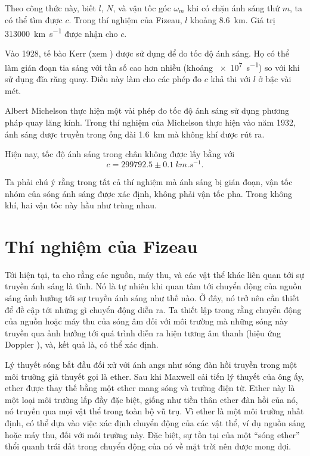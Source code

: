 \noindent
Theo công thức này, biết $l$, $N$, và vận tốc góc $\omega_m$ khi có chặn ánh sáng thứ $m$, ta có thể tìm được $c$.
Trong thí nghiệm của Fizeau, $l$ khoảng \SI{8.6}{km}.
Giá trị \SI{313000}{km.s^{-1}} được nhận cho $c$.

Vào  1928, tế bào Kerr (xem ) được sử dụng để đo tốc độ ánh sáng.
Họ có thể làm gián đoạn tia sáng với tần số cao hơn nhiều (khoảng \SI{e7}{s^{-1}}) so với khi sử dụng đĩa răng quay.
Điều này làm cho các phép đo $c$ khả thi với $l$ ở bậc vài mét.

Albert Michelson thực hiện một vài phép đo tốc độ ánh sáng sử dụng phương pháp quay lăng kính.
Trong thí nghiệm của Michelson thực hiện vào năm 1932, ánh sáng được truyền trong ống dài \SI{1.6}{km} mà không khí được rút ra.

Hiện nay, tốc độ ánh sáng trong chân không được lấy bằng với    
\begin{equation}\label{eq:21_2}
	c = 299792.5 \pm \SI{0.1}{km.s^{-1}}.
\end{equation}

\noindent
Ta phải chú ý rằng trong tất cả thí nghiệm mà ánh sáng bị gián đoạn, vận tốc nhóm của sóng ánh sáng được xác định, không phải vận tốc pha.
Trong không khí, hai vận tốc này hầu như trùng nhau.

\section{Thí nghiệm của Fizeau}\label{sec:21_2}

Tới hiện tại, ta cho rằng các nguồn, máy thu, và các vật thể khác liên quan tới sự truyền ánh sáng là tĩnh.
Nó là tự nhiên khi quan tâm tới chuyển động của nguồn sáng ảnh hưởng tới sự truyền ánh sáng như thế nào.
Ở đây, nó trở nên cần thiết để đề cập tới những gì chuyển động diễn ra.
Ta thiết lập trong  rằng chuyển động của nguồn hoặc máy thu của sóng âm đối với môi trường mà những sóng này truyền qua ảnh hưởng tới quá trình diễn ra hiện tương âm thanh (hiệu ứng Doppler ), và, kết quả là, có thể xác định.

Lý thuyết sóng bắt đầu đối xử với ánh angs như sóng đàn hồi truyền trong một môi trường giả thuyết gọi là ether.
Sau khi Maxwell cải tiến lý thuyết của ông ấy, ether được thay thế bằng một ether mang sóng và trường điện từ.
Ether này là một loại môi trường lấp đầy đặc biệt, giống như tiền thân ether đàn hồi của nó, nó truyền qua mọi vật thể trong toàn bộ vũ trụ.
Vì ether là một môi trường nhất định, có thể dựa vào việc xác định chuyển động của các vật thể, ví dụ nguồn sáng hoặc máy thu, đối với môi trường này.
Đặc biệt, sự tồn tại của một ``sóng ether'' thổi quanh trái đất trong chuyển động của nó về mặt trời nên được mong đợi.

